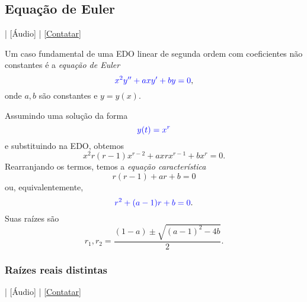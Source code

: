 \subsection{Equação de Euler}

\begin{flushright}
  [Vídeo] | [Áudio] | \href{https://phkonzen.github.io/notas/contato.html}{[Contatar]}
\end{flushright}

Um caso fundamental de uma EDO linear de segunda ordem com coeficientes não constantes é a \emph{equação de Euler}
\begin{equation}
  {\color{blue}x^2y'' + axy' + by = 0},
\end{equation}
onde $a,b$ são constantes e $y = y(x)$.

Assumindo uma solução da forma
\begin{equation}
  {\color{blue}y(t) = x^r}
\end{equation}
e substituindo na EDO, obtemos
\begin{equation}
  x^2r(r-1)x^{r-2} + axrx^{r-1} + bx^r = 0.
\end{equation}
Rearranjando os termos, temos a \emph{equação característica}
\begin{equation}
  r(r-1) + ar + b = 0
\end{equation}
ou, equivalentemente,
\begin{equation}
  {\color{blue}r^2 + (a-1)r + b = 0}.
\end{equation}
Suas raízes são
\begin{equation}
  r_1, r_2 = \frac{(1-a)\pm\sqrt{(a-1)^2-4b}}{2}.
\end{equation}

\subsubsection{Raízes reais distintas}

\begin{flushright}
  [Vídeo] | [Áudio] | \href{https://phkonzen.github.io/notas/contato.html}{[Contatar]}
\end{flushright}

